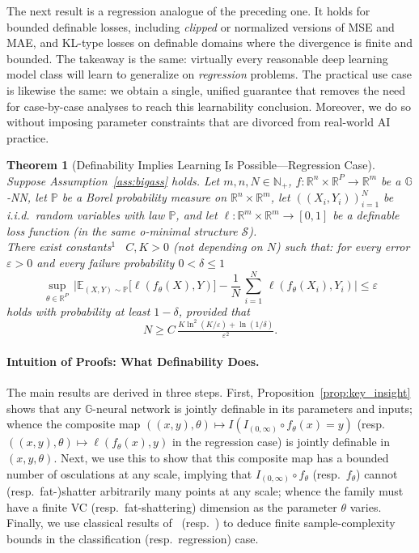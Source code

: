 \documentclass{article}
\theoremstyle{plain}
\newtheorem{theorem}{Theorem}[section]
\theoremstyle{definition}
\theoremstyle{remark}
\theoremstyle{plain}
\numberwithin{thm}{section}
\theoremstyle{definition}
\numberwithin{equation}{section}
\begin{document}
The next result is a regression analogue of the preceding one. It holds for bounded definable losses, including \textit{clipped} or normalized versions of MSE and MAE, and KL-type losses on definable domains where the divergence is finite and bounded.
The takeaway is the same: virtually every reasonable deep learning model class will learn to generalize on \textit{regression} problems. The practical use case is likewise the same: we obtain a single, unified guarantee that removes the need for case-by-case analyses to reach this learnability conclusion. Moreover, we do so without imposing parameter constraints that are divorced from real-world AI practice.
\begin{theorem}[Definability Implies Learning Is Possible---Regression Case]
\label{thrm:reg}  
Suppose Assumption~\ref{ass:bigass} holds.
Let $m,n,N\in \mathbb{N}_+$, $f:\mathbb{R}^n\times \mathbb{R}^P\to \mathbb{R}^m$ be a $\mathbb{G}$-NN, let $\mathbb{P}$ be a Borel probability measure on $\mathbb{R}^n\times \mathbb{R}^m$, let $((X_i,Y_i))_{i=1}^N$ be i.i.d.\ random variables with law $\mathbb{P}$,
and let $\ell:\mathbb{R}^m\times \mathbb{R}^m\to [0,1]$ be a definable loss function (in the same o-minimal structure $\mathcal{S}$).
\hfill\\
\noindent
There exist constants$^1$~%
$C,K>0$ (not depending on $N$) such that: for every error $\varepsilon>0$ and every failure probability $0<\delta \le 1$ 
\[
    \sup_{\theta\in \mathbb{R}^P}\,
    \biggl|
        \mathbb{E}_{(X,Y)\sim \mathbb{P}}\big[
            \ell(f_{\theta}(X),Y)
        \big]
        -
        \frac1{N}\,\sum_{i=1}^N\,
            \ell(f_{\theta}(X_i),Y_i)
    \biggr|
    \le
    \varepsilon
\]
holds with probability at least $1-\delta$, provided that 
\[
N
\ge
   C\,\tfrac{K\ln^2(K/\varepsilon)+\ln(1/\delta)}{\varepsilon^2}
.
\]
\end{theorem}

\paragraph{Intuition of Proofs: What Definability Does.}
The main results are derived in three steps.  First, Proposition~\ref{prop:key_insight} shows that any $\mathbb{G}$-neural network is jointly definable in its parameters and inputs; whence the composite map 
$
    ((x,y),\theta)\mapsto I(I_{(0,\infty)}\circ f_\theta(x) = y)
$ 
(resp.\ $((x,y),\theta)\mapsto \ell(f_\theta(x) , y)$ in the regression case) 
is jointly definable in $(x,y,\theta)$.  Next, we use this to show that this composite map has a bounded number of osculations at any scale, implying that $I_{(0,\infty)}\circ f_{\theta}$ (resp.\ $f_{\theta}$) cannot (resp.\ fat-)shatter arbitrarily many points at any scale; whence the family must have a finite VC (resp.\ fat-shattering) dimension as the parameter $\theta$ varies.
Finally, we use classical results of~\cite{Valiant1984,BlumerEhrenfeuchtHausslerWarmuth1989} (resp.~\cite{AlonBenDavidCesaBianchiHaussler_PDGeneralization}) to deduce finite sample-complexity bounds in the classification (resp.\ regression) case.
\end{document}
